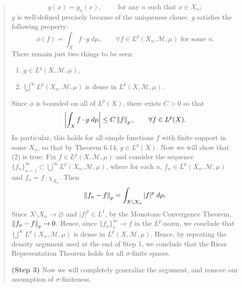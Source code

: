 \documentclass{article}
\begin{document}
\begin{itemize}
\begin{quote}
\begin{solutions}
		\begin{equation}
			g(x) = g_{n}(x), \qquad \text{ for any $n$ such that $x \in X_{n}$};
		\end{equation}
	$g$ is well-defined precisely because of the uniqueness clause. $g$ satisfies the following property:
		\begin{equation}
			\phi(f) = \int_{X}f\cdot g \;d\mu, \qquad \forall f \in L^{p}(X_{n}, \mathscr{M}, \mu) \text{ for some $n$}.
		\end{equation}
	There remain just two things to be seen: \vspace{-0.15cm}
		\begin{enumerate}[itemsep =-2pt,label = (\arabic{*})]
			\item $g \in L^{q}(X, \mathscr{M}, \mu)$, 
			\item $\bigcup^{\infty}L^{p}(X_{n}, \mathscr{M}, \mu)$ is dense in $L^{p}(X, \mathscr{M}, \mu)$. 
		\end{enumerate}
	Since $\phi$ is bounded on all of $L^{p}(X)$, there exists $C > 0$ so that 
		\begin{equation}
			\left| \int_{X}f\cdot g\;d\mu \right| \leq C \left\Vert f \right\Vert_{p}, \qquad \forall f \in L^{p}(X). 
		\end{equation}
	In particular, this holds for all simple functions $f$ with finite support in some $X_{n}$, so that by Theorem 6.14, $g \in L^{q}(X)$. Now we will show that (2) is true. Fix $f \in L^{p}(X, \mathscr{M}, \mu)$ and consider the sequence $\{f_{n}\}_{n = 1}^{\infty} \subset \bigcup^{\infty}L^{p}(X_{n}, \mathscr{M}, \mu)$, where for each $n$, $f_{n} \in L^{p}(X_{n}, \mathscr{M}, \mu)$ and $f_{n} = f \cdot \chi_{X_{n}}$. Then 
	\begin{equation}
		\left\Vert f_{n} - f \right\Vert_{p} = \int_{X \setminus X_{n}}|f|^{p}\;d\mu. 
	\end{equation}
	Since $X\setminus X_{n} \to \varnothing$ and $|f|^{p} \in L^{1}$, by the Monotone Convergence Theorem, $\left\Vert f_{n} -f \right\Vert_{p} \to 0$. Hence, since $\{f_{n}\}_{1}^{\infty} \to f$ in the $L^{p}$-norm, we conclude that $\bigcup^{\infty}L^{p}(X_{n}, \mathscr{M}, \mu)$ is dense in $L^{p}(X, \mathscr{M}, \mu)$. Hence, by repeating the density argument used at the end of Step 1, we conclude that the Riesz Representation Theorem holds for all $\sigma$-finite spaces. 
	\end{solutions} 
	\textbf{(Step 3)} Now we will completely generalize the argument, and remove our assumption of $\sigma$-finiteness.\newline 
	\begin{solutions}

\end{solutions}
\end{quote}
\end{itemize}
\end{document}
